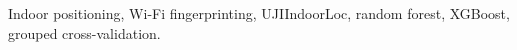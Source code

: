 \documentclass[conference]{IEEEtran}
\newcommand{\paperkeywords}{Indoor positioning, Wi-Fi fingerprinting,
  UJIIndoorLoc, random forest, XGBoost, grouped cross-validation}
\begin{document}
\begin{IEEEkeywords}
\paperkeywords.
\end{IEEEkeywords}












\end{document}
